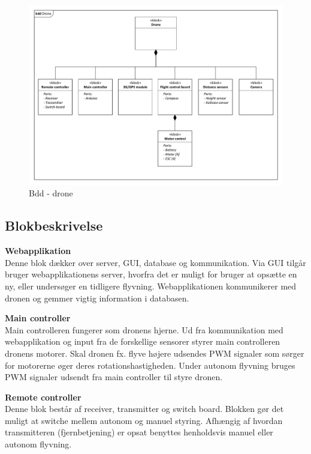 \begin{figure}[H]
\centering
\includegraphics[width=1\textwidth]{Billeder/BDD/bdd_drone.pdf}
\caption{Bdd - drone}
\label{fig:bdd_drone}
\end{figure}

\newpage

\subsection{Blokbeskrivelse}

\textbf{Webapplikation}\\
Denne blok dækker over server, GUI, database og kommunikation. Via GUI tilgår bruger webapplikationens server, hvorfra det er muligt for bruger at opsætte en ny, eller undersøger en tidligere flyvning. Webapplikationen kommunikerer med dronen og gemmer vigtig information i databasen.

\textbf{Main controller}\\
Main controlleren fungerer som dronens hjerne. Ud fra kommunikation med webapplikation og input fra de forskellige sensorer styrer main controlleren dronens motorer. Skal dronen fx. flyve højere udsendes PWM signaler som sørger for motorerne øger deres rotationshastigheden. Under autonom flyvning bruges PWM signaler udsendt fra main controller til styre dronen. 

\textbf{Remote controller}\\
Denne blok består af receiver, transmitter og switch board. Blokken gør det muligt at switche mellem autonom og manuel styring. Afhængig af hvordan transmitteren (fjernbetjening) er opsat benyttes henholdsvis manuel eller autonom flyvning.

